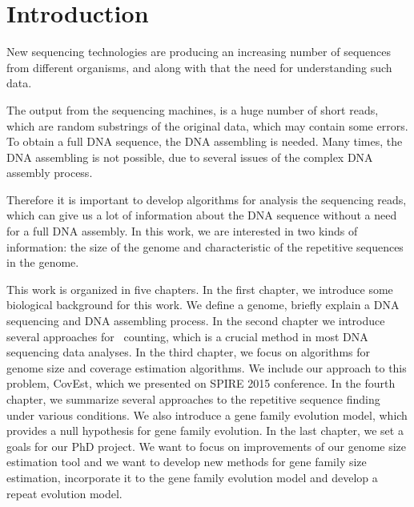 \chapter*{Introduction}
{}

New sequencing technologies are producing an increasing number of sequences from different organisms, and along with that the need for understanding such data.

The output from the sequencing machines, is a huge number of short reads, which are random substrings of the original data, which may contain some errors. To obtain a full DNA sequence, the DNA assembling is needed. Many times, the DNA assembling is not possible, due to several issues of the complex DNA assembly process.

Therefore it is important to develop algorithms for analysis the sequencing reads, which can give us a lot of information about the DNA sequence without a need for a full DNA assembly.
In this work, we are interested in two kinds of information: the size of the genome and characteristic of the repetitive sequences in the genome.

This work is organized in five chapters.
In the first chapter, we introduce some biological background for this work. We define a genome, briefly explain a DNA sequencing and DNA assembling process.
In the second chapter we introduce several approaches for \kmer\ counting, which is a crucial method in most DNA sequencing data analyses.
In the third chapter, we focus on algorithms for genome size and coverage estimation algorithms. We include our approach to this problem, CovEst\cite{covest}, which we presented on SPIRE 2015 conference.
In the fourth chapter, we summarize several approaches to the repetitive sequence finding under various conditions. We also introduce a gene family evolution model, which provides a null hypothesis for gene family evolution.
In the last chapter, we set a goals for our PhD project. We want to focus on improvements of our genome size estimation tool and we want to develop new methods for gene family size estimation, incorporate it to the gene family evolution model and develop a repeat evolution model.
